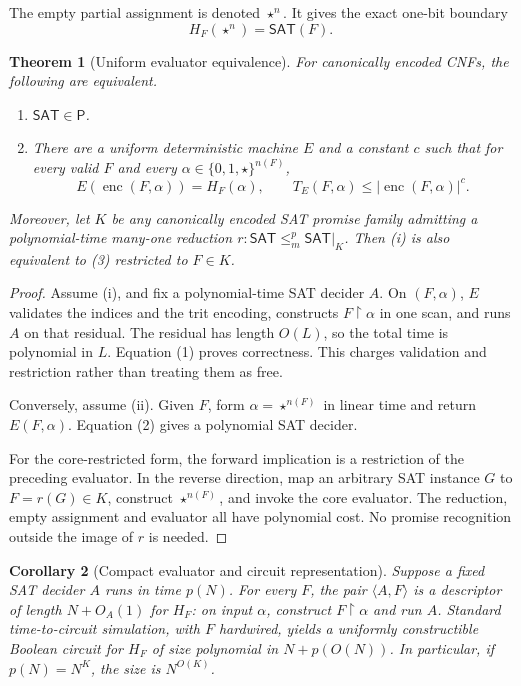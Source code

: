 \documentclass[11pt]{article}
\newtheorem{theorem}{Theorem}
\newtheorem{corollary}[theorem]{Corollary}
\newcommand{\SAT}{\mathsf{SAT}}
\begin{document}
The empty partial assignment is denoted $\star^n$.  It gives the exact
one-bit boundary
\[
 H_F(\star^n)=\SAT(F).                                      \tag{2}
\]

\begin{theorem}[Uniform evaluator equivalence]
\label{thm:eval}
For canonically encoded CNFs, the following are equivalent.
\begin{enumerate}[label=(\roman*)]
\item $\SAT\in\mathsf P$.
\item There are a uniform deterministic machine $E$ and a constant $c$ such
that for every valid $F$ and every $\alpha\in\{0,1,\star\}^{n(F)}$,
\[
 E(\operatorname{enc}(F,\alpha))=H_F(\alpha),\qquad
 T_E(F,\alpha)\le |\operatorname{enc}(F,\alpha)|^c.       \tag{3}
\]
\end{enumerate}
Moreover, let $K$ be any canonically encoded SAT promise family admitting a
polynomial-time many-one reduction $r:\SAT\le_m^p \SAT|_K$.  Then (i) is also
equivalent to (3) restricted to $F\in K$.
\end{theorem}

\begin{proof}
Assume (i), and fix a polynomial-time SAT decider $A$.  On $(F,\alpha)$,
$E$ validates the indices and the trit encoding, constructs
$F\upharpoonright\alpha$ in one scan, and runs $A$ on that residual.  The
residual has length $O(L)$, so the total time is polynomial in $L$.  Equation
(1) proves correctness.  This charges validation and restriction rather than
treating them as free.

Conversely, assume (ii).  Given $F$, form $\alpha=\star^{n(F)}$ in linear
time and return $E(F,\alpha)$.  Equation (2) gives a polynomial SAT decider.

For the core-restricted form, the forward implication is a restriction of
the preceding evaluator.  In the reverse direction, map an arbitrary SAT
instance $G$ to $F=r(G)\in K$, construct $\star^{n(F)}$, and invoke the core
evaluator.  The reduction, empty assignment and evaluator all have
polynomial cost.  No promise recognition outside the image of $r$ is needed.
\end{proof}

\begin{corollary}[Compact evaluator and circuit representation]
\label{cor:compact}
Suppose a fixed SAT decider $A$ runs in time $p(N)$.  For every $F$, the pair
$\langle A,F\rangle$ is a descriptor of length $N+O_A(1)$ for $H_F$: on input
$\alpha$, construct $F\upharpoonright\alpha$ and run $A$.  Standard
time-to-circuit simulation, with $F$ hardwired, yields a uniformly
constructible Boolean circuit for $H_F$ of size polynomial in
$N+p(O(N))$.  In particular, if $p(N)=N^K$, the size is $N^{O(K)}$.
\end{corollary}
\end{document}
